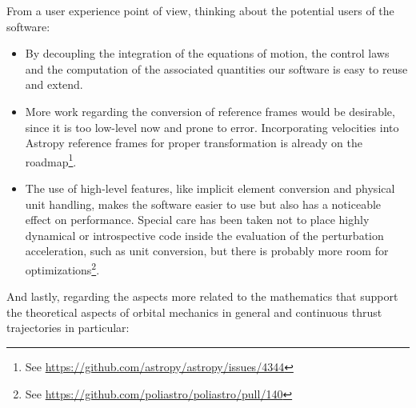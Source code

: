 From a user experience point of view, thinking about the potential users of the software:

\begin{itemize}
\item By decoupling the integration of the equations of motion, the control laws and the computation of the associated quantities our software is easy to reuse and extend.
\item More work regarding the conversion of reference frames would be desirable, since it is too low-level now and prone to error. Incorporating velocities into Astropy reference frames for proper transformation is already on the roadmap\footnote{See \url{https://github.com/astropy/astropy/issues/4344}}.
\item The use of high-level features, like implicit element conversion and physical unit handling, makes the software easier to use but also has a noticeable effect on performance. Special care has been taken not to place highly dynamical or introspective code inside the evaluation of the perturbation acceleration, such as unit conversion, but there is probably more room for optimizations\footnote{See \url{https://github.com/poliastro/poliastro/pull/140}}.
\end{itemize}

And lastly, regarding the aspects more related to the mathematics that support the theoretical aspects of orbital mechanics in general and continuous thrust trajectories in particular:

